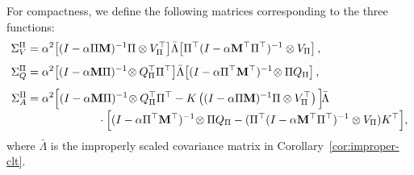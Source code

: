 \documentclass[twoside,11pt]{article}
\numberwithin{equation}{section}
\newcommand{\lp}{\left(}
\newcommand{\rp}{\right)}
\begin{document}
For compactness, we define the following matrices corresponding to the three functions:
\begin{align*}
\Sigma_V^\Pi &= \alpha^2\!\left[
 (I-\alpha\Pi\mathbf{M})^{-1}\Pi\otimes V_\Pi^\top
 \right]\!\bar\Lambda
 \!\left[
 \Pi^\top(I-\alpha\mathbf{M}^\top\Pi^\top)^{-1}\otimes V_\Pi
 \right],\\[0.4em]
\Sigma_Q^\Pi &= \alpha^2\!\left[
 (I-\alpha\mathbf{M}\Pi)^{-1}\!\otimes Q_\Pi^\top\Pi^\top
 \right]\!\bar\Lambda
 \!\left[
 (I-\alpha\Pi^\top\mathbf{M}^\top)^{-1}\!\otimes \Pi Q_\Pi
 \right],\\[0.4em]
\Sigma_A^\Pi &= \alpha^2\Big[
  (I-\alpha\mathbf{M}\Pi)^{-1}\!\otimes Q_\Pi^\top\Pi^\top
  - K \lp (I-\alpha\Pi\mathbf{M})^{-1}\Pi\otimes V_\Pi^\top \rp
 \Big]\!\bar\Lambda\\[-0.3em]
&\hspace{6.3em}\cdot
 \Big[
 (I-\alpha\Pi^\top\mathbf{M}^\top)^{-1}\!\otimes \Pi Q_\Pi
 - (\Pi^\top(I-\alpha\mathbf{M}^\top\Pi^\top)^{-1}\otimes V_\Pi)K^\top
 \Big],
\end{align*}
where $\bar\Lambda$ is the improperly scaled covariance matrix in Corollary~\ref{cor:improper-clt}.
\end{document}
